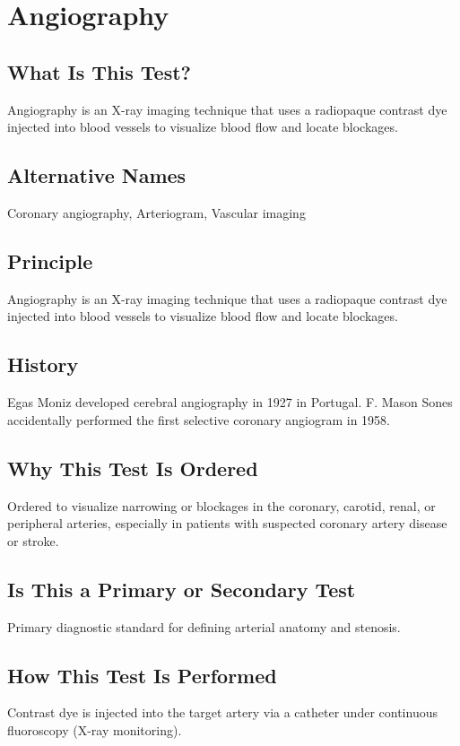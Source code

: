 \chapter{Angiography}

\section*{What Is This Test?}
Angiography is an X-ray imaging technique that uses a radiopaque contrast dye injected into blood vessels to visualize blood flow and locate blockages.

\section*{Alternative Names}
Coronary angiography, Arteriogram, Vascular imaging

\section*{Principle}
Angiography is an X-ray imaging technique that uses a radiopaque contrast dye injected into blood vessels to visualize blood flow and locate blockages.

\section*{History}
Egas Moniz developed cerebral angiography in 1927 in Portugal. F. Mason Sones accidentally performed the first selective coronary angiogram in 1958.

\section*{Why This Test Is Ordered}
Ordered to visualize narrowing or blockages in the coronary, carotid, renal, or peripheral arteries, especially in patients with suspected coronary artery disease or stroke.

\section*{Is This a Primary or Secondary Test}
Primary diagnostic standard for defining arterial anatomy and stenosis.

\section*{How This Test Is Performed}
Contrast dye is injected into the target artery via a catheter under continuous fluoroscopy (X-ray monitoring).

